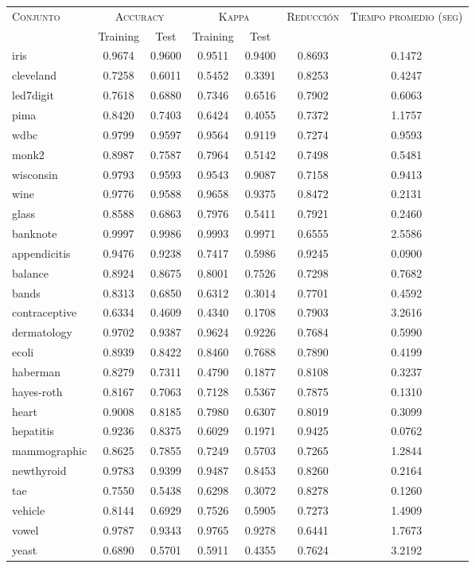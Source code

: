 \begin{table}[]
\centering
\begin{tabular}{l c c c c c c}
\hline
\multirow{2}{*}{\textsc{Conjunto}}
	& \multicolumn{2}{c}{\textsc{Accuracy}}
	& \multicolumn{2}{c}{\textsc{Kappa}}
	& \textsc{Reducción}
	& \textsc{Tiempo promedio (seg)} \\
	& Training & Test
	& Training & Test \\ 
\hline
\hline

iris & 0.9674 & 0.9600 & 0.9511 & 0.9400 & 0.8693 & 0.1472 \\
cleveland & 0.7258 & 0.6011 & 0.5452 & 0.3391 & 0.8253 & 0.4247 \\
led7digit & 0.7618 & 0.6880 & 0.7346 & 0.6516 & 0.7902 & 0.6063 \\
pima & 0.8420 & 0.7403 & 0.6424 & 0.4055 & 0.7372 & 1.1757 \\
wdbc & 0.9799 & 0.9597 & 0.9564 & 0.9119 & 0.7274 & 0.9593 \\
monk2 & 0.8987 & 0.7587 & 0.7964 & 0.5142 & 0.7498 & 0.5481 \\
wisconsin & 0.9793 & 0.9593 & 0.9543 & 0.9087 & 0.7158 & 0.9413 \\
wine & 0.9776 & 0.9588 & 0.9658 & 0.9375 & 0.8472 & 0.2131 \\
glass & 0.8588 & 0.6863 & 0.7976 & 0.5411 & 0.7921 & 0.2460 \\
banknote & 0.9997 & 0.9986 & 0.9993 & 0.9971 & 0.6555 & 2.5586 \\
appendicitis & 0.9476 & 0.9238 & 0.7417 & 0.5986 & 0.9245 & 0.0900 \\
balance & 0.8924 & 0.8675 & 0.8001 & 0.7526 & 0.7298 & 0.7682 \\
bands & 0.8313 & 0.6850 & 0.6312 & 0.3014 & 0.7701 & 0.4592 \\
contraceptive & 0.6334 & 0.4609 & 0.4340 & 0.1708 & 0.7903 & 3.2616 \\
dermatology & 0.9702 & 0.9387 & 0.9624 & 0.9226 & 0.7684 & 0.5990 \\
ecoli & 0.8939 & 0.8422 & 0.8460 & 0.7688 & 0.7890 & 0.4199 \\
haberman & 0.8279 & 0.7311 & 0.4790 & 0.1877 & 0.8108 & 0.3237 \\
hayes-roth & 0.8167 & 0.7063 & 0.7128 & 0.5367 & 0.7875 & 0.1310 \\
heart & 0.9008 & 0.8185 & 0.7980 & 0.6307 & 0.8019 & 0.3099 \\
hepatitis & 0.9236 & 0.8375 & 0.6029 & 0.1971 & 0.9425 & 0.0762 \\
mammographic & 0.8625 & 0.7855 & 0.7249 & 0.5703 & 0.7265 & 1.2844 \\
newthyroid & 0.9783 & 0.9399 & 0.9487 & 0.8453 & 0.8260 & 0.2164 \\
tae & 0.7550 & 0.5438 & 0.6298 & 0.3072 & 0.8278 & 0.1260 \\
vehicle & 0.8144 & 0.6929 & 0.7526 & 0.5905 & 0.7273 & 1.4909 \\
vowel & 0.9787 & 0.9343 & 0.9765 & 0.9278 & 0.6441 & 1.7673 \\
yeast & 0.6890 & 0.5701 & 0.5911 & 0.4355 & 0.7624 & 3.2192 \\


\end{tabular}
\end{table}
